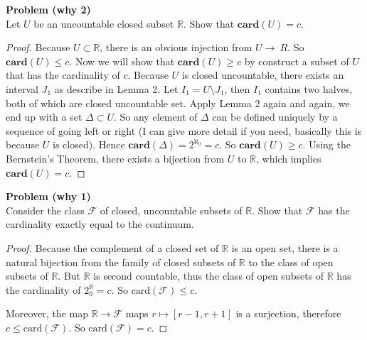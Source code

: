 \documentclass[12pt, a4paper]{article}
\theoremstyle{plain}
\newcommand{\R}{\mathbb{R}}
\newcommand{\F}{\mathcal{F}}
\newcommand{\card}{\mathbf{card}}
\newenvironment{problem}[2][Problem]
    { \begin{mdframed}[backgroundcolor=gray!20] \textbf{#1 #2} \\}
    {  \end{mdframed}}
\begin{document}
\begin{problem}{(why 2)}
Let $U$ be an uncountable closed subset $\R$. Show that $\card (U)=c$.
\end{problem}
	\begin{proof}
	Because $U\subset \R$, there is an obvious injection from $U\rightarrow \ R$. So $\card(U)\leq c$. Now we will show that $\card(U)\geq c$ by construct a subset of $U$ that has the cardinality of $c$. Because $U$ is closed uncountable, there exists an interval $J_1$ as describe in Lemma 2. Let $I_1 = U\setminus J_1$, then $I_1$ contains two halves, both of which are closed uncountable set. Apply Lemma 2 again and again, we end up with a set $\Delta\subset U$. So any element of $\Delta$ can be defined uniquely by a sequence of going left or right (I can give more detail if you need, basically this is because $U$ is closed). Hence $\card(\Delta) = 2^{\aleph_0}=c$. So $\card (U)\geq c$. Using the Bernstein's Theorem, there exists a bijection from $U$ to $\R$, which implies $\card(U)=c$.
	\end{proof}
	
	
\begin{problem}{(why 1)}
Consider the class $\F$ of closed, uncountable subsets of $\R$. Show that $\F$ has the cardinality exactly equal to the continuum.
\end{problem}
	\begin{proof}
	Because the complement of a closed set of $\R$ is an open set, there is a natural bijection from the family of closed subsets of $\R$ to the class of open subsets of $\R$. But $\R$ is second countable, thus the class of open subsets of $\R$ has the cardinality of $2^\aleph_0 = c$. So $\text{card}(\F)\leq c$.
	
	Moreover, the map $\R\rightarrow \F$ maps $r\mapsto [r-1,r+1]$ is a surjection, therefore $c\leq \text{card}(\F)$. So $\text{card}(\F) = c$.
	\end{proof}
	
\end{document}
